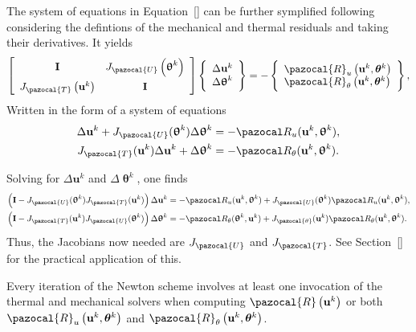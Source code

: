 The system of equations in Equation~\eqref{} can be further symplified following \cite{degroote_development_2010} considering the defintions of the mechanical and thermal residuals and taking their derivatives.
It yields
\begin{equation}
\left[\begin{array}{cc}
\mathbf I & J_{\pazocal{U}}\left(\bm{\uptheta}^{k}\right) \\[7pt] J_{\pazocal{T}}\left(\mathbf{u}^{k}\right) & \mathbf I
\end{array}\right]
\left\{\begin{array}{c}\Delta \mathbf{u}^{k} \\ \Delta \bm{\uptheta}^{k}\end{array}\right\}
=-\left\{\begin{array}{l}\pazocal{R}_{u}\left(\mathbf{u}^{k}, \boldsymbol{\theta}^{k}\right) \\ \pazocal{R}_{\theta}\left(\mathbf{u}^{k}, \boldsymbol{\theta}^{k}\right)\end{array}\right\},
\end{equation}
Written in the form of a system of equations
\begin{align}
  \Delta \mathbf u^k + J_\pazocal{U}(\bm \uptheta^k) \Delta \bm\uptheta^k &= - \pazocal R_u(\mathbf u^k, \bm \uptheta^k),\\
  J_\pazocal{T}(\mathbf u^k) \Delta \mathbf u^k + \Delta \bm\uptheta^k &= - \pazocal R_\theta(\mathbf u^k, \bm \uptheta^k).
\end{align}

Solving for \(\Delta \mathbf u^k\) and \(\Delta \bm \uptheta^k\), one finds
\begin{align}
  \left(\mathbf I- J_\pazocal{U}(\bm\uptheta^k)J_\pazocal{T}(\mathbf u^k)\right)\Delta \mathbf u^k &= - \pazocal R_u(\mathbf u^k, \bm \uptheta^k)+J_\pazocal{U}(\bm\uptheta^k)\pazocal R_u(\mathbf u^k, \bm\uptheta^k),\\
  \left(\mathbf I- J_\pazocal{T}(\mathbf u^k)J_\pazocal{U}(\bm\uptheta^k)\right)\Delta \bm\uptheta^k &= - \pazocal R_\theta(\bm \uptheta^k, \mathbf u^k)+J_\pazocal{\theta}(\mathbf u^k)\pazocal R_\theta(\mathbf u^k, \bm\uptheta^k).
\end{align}
Thus, the Jacobians now needed are \(J_\pazocal{U}\) and \(J_\pazocal{T}\).
See Section~\ref{} for the practical application of this.

Every iteration of the Newton scheme involves at least one invocation of the thermal and mechanical solvers when computing $\pazocal{R}\left(\mathbf{u}^{k}\right)$ or both $\pazocal{R}_{u}\left(\mathbf{u}^{k}, \boldsymbol{\theta}^{k}\right)$ and $\pazocal{R}_{\theta}\left(\mathbf{u}^{k}, \boldsymbol{\theta}^{k}\right)$.

